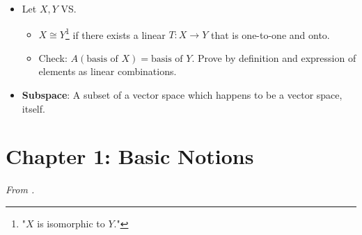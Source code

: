 \documentclass[../../notes.tex]{subfiles}
\begin{document}
\begin{itemize}
\begin{itemize}
    \end{itemize}
    \item Let $X,Y$ VS.
    \begin{itemize}
        \item $X\cong Y$\footnote{"$X$ is isomorphic to $Y$."} if there exists a linear $T:X\to Y$ that is one-to-one and onto.
        \item Check: $A(\text{basis of }X)=\text{basis of }Y$. Prove by definition and expression of elements as linear combinations.
    \end{itemize}
    \item \textbf{Subspace}: A subset of a vector space which happens to be a vector space, itself.
\end{itemize}



\section{Chapter 1: Basic Notions}
\emph{From \textcite{bib:Treil}.}
\end{document}
